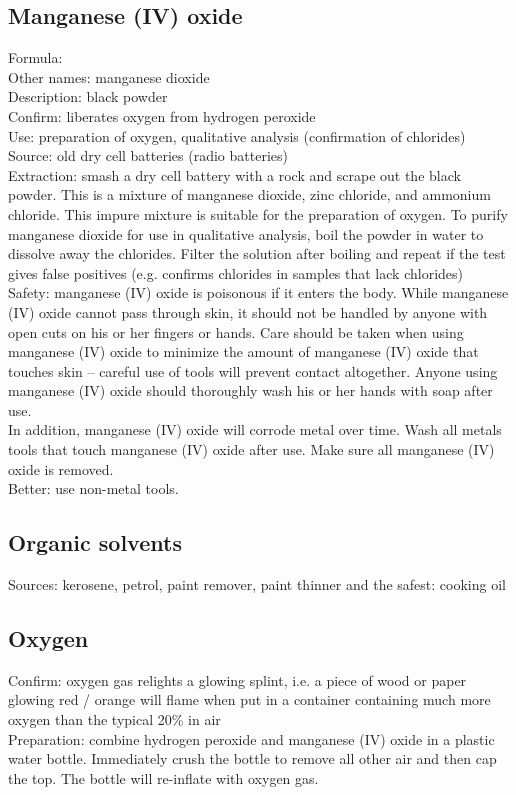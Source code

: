 \subsection*{Manganese (IV) oxide}
Formula: \\
Other names: manganese dioxide\\
Description: black powder\\
Confirm: liberates oxygen from hydrogen peroxide\\
Use: preparation of oxygen, 
qualitative analysis (confirmation of chlorides)\\
Source: old dry cell batteries (radio batteries)\\
Extraction: smash a dry cell battery with a rock 
and scrape out the black powder. 
This is a mixture of manganese dioxide, 
zinc chloride, 
and ammonium chloride. 
This impure mixture is suitable for the preparation of oxygen. 
To purify manganese dioxide for use in qualitative analysis, 
boil the powder in water to dissolve away the chlorides. 
Filter the solution after boiling 
and repeat if the test gives false positives (e.g. 
confirms chlorides in samples that lack chlorides)\\
Safety: manganese (IV) oxide is poisonous if it enters the body. While manganese (IV) oxide cannot pass through skin, it should not be handled by anyone with open cuts on his or her fingers or hands. Care should be taken when using manganese (IV) oxide to minimize the amount of manganese (IV) oxide that touches skin – careful use of tools will prevent contact altogether. Anyone using manganese (IV) oxide should thoroughly wash his or her hands with soap after use.\\
In addition, manganese (IV) oxide will corrode metal over time. Wash all metals tools that touch manganese (IV) oxide after use. Make sure all manganese (IV) oxide is removed.\\
Better: use non-metal tools. 
\subsection*{Organic solvents}
Sources: kerosene, 
petrol, 
paint remover, 
paint thinner and the safest: cooking oil
\subsection*{Oxygen}
Confirm: oxygen gas relights a glowing splint, 
i.e. 
a piece of wood or paper glowing red / orange 
will flame when put in a container 
containing much more oxygen than the typical 20\% in air\\
Preparation: combine hydrogen peroxide 
and manganese (IV) oxide in a plastic water bottle. 
Immediately crush the bottle to remove all other air and then cap the top. 
The bottle will re-inflate with oxygen gas.
